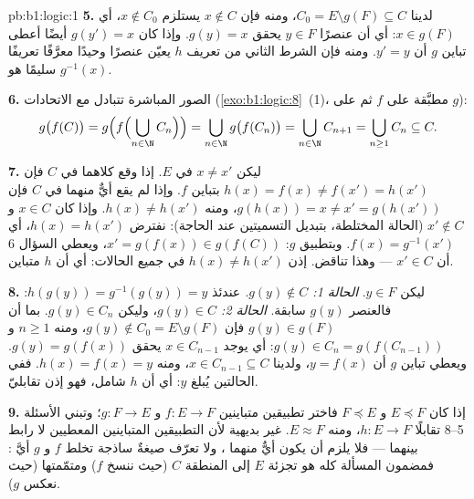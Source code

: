 \begin{solution}{pb:b1:logic:1}
\textbf{5.} لدينا $C_0 = E \setminus g(F) \subseteq C$، ومنه فإن $x \notin C$
يستلزم $x \notin C_0$، أي $x \in g(F)$: أي أن عنصرًا $y \in F$ يحقق
$g(y) = x$. وإذا كان $g(y') = x$ أيضًا أعطى تباين $g$ أن $y' = y$.
ومنه فإن الشرط الثاني من تعريف $h$ يعيّن عنصرًا وحيدًا معرَّفًا
تعريفًا سليمًا هو $g^{-1}(x)$.

\textbf{6.} الصور المباشرة تتبادل مع الاتحادات
(\cref{exo:b1:logic:8}~(1)، مطبَّقة على $f$ ثم على $g$):
\[
g\bigl(f(C)\bigr)
= g\Bigl(f\Bigl(\bigcup_{n \in \N} C_n\Bigr)\Bigr)
= \bigcup_{n \in \N} g\bigl(f(C_n)\bigr)
= \bigcup_{n \in \N} C_{n+1}
= \bigcup_{n \geq 1} C_n \subseteq C .
\]

\textbf{7.} ليكن $x \neq x'$ في $E$. إذا وقع كلاهما في $C$ فإن $h(x) =
f(x) \neq f(x') = h(x')$ بتباين $f$. وإذا لم يقع أيٌّ منهما في
$C$ فإن $g(h(x)) = x \neq x' = g(h(x'))$، ومنه $h(x) \neq h(x')$. وإذا كان
$x \in C$ و $x' \notin C$ (الحالة المختلطة، بتبديل التسميتين عند
الحاجة): نفترض $h(x) = h(x')$، أي $f(x) = g^{-1}(x')$. وبتطبيق $g$:
$x' = g(f(x)) \in g(f(C))$، ويعطي السؤال 6 أن $x' \in C$ ---
وهذا تناقض. إذن $h(x) \neq h(x')$ في جميع الحالات: أي أن $h$ متباين.

\textbf{8.} ليكن $y \in F$. \emph{الحالة 1: $g(y) \notin C$.} عندئذ
$h(g(y)) = g^{-1}(g(y)) = y$: فالعنصر $g(y)$ سابقة.
\emph{الحالة 2: $g(y) \in C$}، وليكن $g(y) \in C_n$. بما أن $g(y) \in
g(F)$ فإن $g(y) \notin C_0 = E \setminus g(F)$، ومنه $n \geq 1$
و$g(y) \in C_n = g(f(C_{n-1}))$: أي يوجد $x \in C_{n-1}$ يحقق
$g(y) = g(f(x))$. ويعطي تباين $g$ أن $y = f(x)$، ولدينا $x \in
C_{n-1} \subseteq C$، ومنه $h(x) = f(x) = y$. ففي الحالتين يُبلغ $y$:
أي أن $h$ شامل، فهو إذن تقابليّ.

\textbf{9.} إذا كان $E \preceq F$ و $F \preceq E$ فاختر تطبيقين
متباينين $f
\colon E \to F$ و $g \colon F \to E$؛ وتبني الأسئلة 5--8
تقابلًا $h \colon E \to F$، ومنه $E \approx F$.  غير بديهية
لأن التطبيقين المتباينين المعطيين لا رابط بينهما --- فلا يلزم أن
يكون أيٌّ منهما ، ولا تعرّف صيغةٌ ساذجة تخلط $f$ و $g$ أيَّ
: فمضمون المسألة كله هو تجزئة $E$ إلى المنطقة $C$ (حيث ننسخ
$f$) ومتمّمتها (حيث نعكس $g$).


\end{solution}
